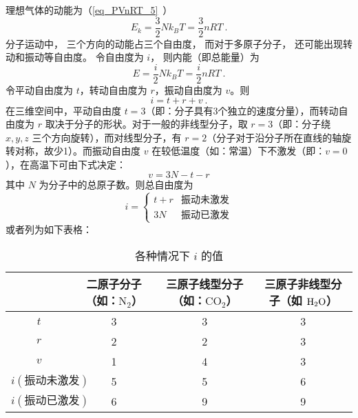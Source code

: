 
\begin{issues}
\issueDraft
\end{issues}


理想气体的动能为（\autoref{eq_PVnRT_5}~）
\begin{equation}
E_k = \frac32 Nk_B T = \frac{3}{2}nRT~.
\end{equation}
分子运动中， 三个方向的动能占三个自由度， 而对于多原子分子， 还可能出现转动和振动等自由度。 令自由度为 $i$， 则内能（即总能量）为
\begin{equation}\label{eq_IdgEng_1}
E = \frac{i}{2}Nk_B T = \frac{i}{2}nRT~.
\end{equation}
令平动自由度为 $t$，转动自由度为 $r$，振动自由度为 $v$。则
\begin{equation}
i=t+r+v~.
\end{equation}
在三维空间中，平动自由度 $t=3$（即：分子具有3个独立的速度分量），而转动自由度为 $r$ 取决于分子的形状。对于一般的非线型分子，取 $r=3$（即：分子绕 $x,y,z$ 三个方向旋转），而对线型分子，有 $r=2$（分子对于沿分子所在直线的轴旋转对称，故少1）。而振动自由度 $v$ 在较低温度（如：常温）下不激发（即：$v=0$），在高温下可由下式决定：
\begin{equation}
v=3N-t-r
\end{equation}
其中 $N$ 为分子中的总原子数。则总自由度为
\begin{equation}
i=\left\{\begin{matrix}{t+r}&{\text{振动未激发}}\\{3N}&{\text{振动已激发}}\end{matrix}\right.
\end{equation}
或者列为如下表格：\begin{table}[ht]
\centering
\caption{各种情况下 $i$ 的值}\label{tab_IdgEng_1}
\begin{tabular}{|c|c|c|c|}
\hline
 & 二原子分子（如：$\text{N}_2$） & 三原子线型分子（如：$\text{CO}_2$） & 三原子非线型分子（如 $\text H_2\text O$） \\
\hline
$t$ & 3 & 3 & 3 \\
\hline
$r$ & 2 & 2 & 3 \\
\hline
$v$ & 1 & 4 & 3 \\
\hline
$i(\text{振动未激发})$ & 5 & 5 & 6 \\
\hline
$i(\text{振动已激发})$ & 6 & 9 & 9 \\
\hline
\end{tabular}
\end{table}